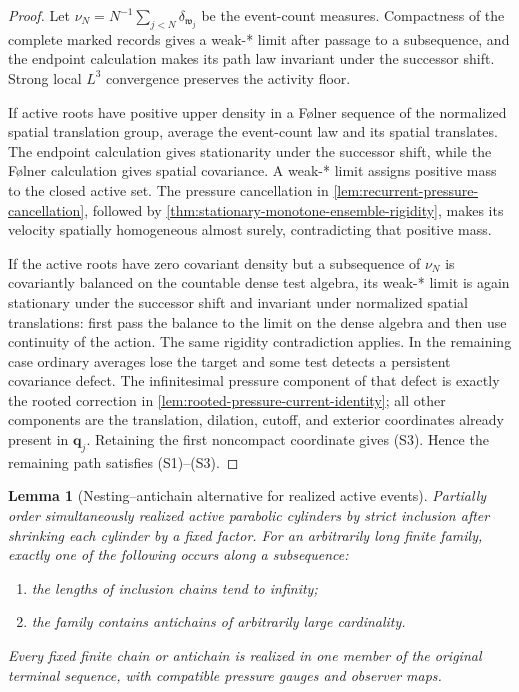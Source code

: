 \documentclass[11pt]{amsart}
\numberwithin{equation}{section}
\theoremstyle{plain}
\newtheorem{lemma}[lemma]{Lemma}
\theoremstyle{definition}
\theoremstyle{remark}
\begin{document}
\begin{proof}
Let \(\nu_N=N^{-1}\sum_{j<N}\delta_{\mathfrak w_j}\) be the event-count
measures.  Compactness of the complete marked records gives a weak-* limit
after passage to a subsequence, and the endpoint calculation makes its path
law invariant under the successor shift.  Strong local \(L^3\) convergence
preserves the activity floor.

If active roots have positive upper density in a F\o lner sequence of the
normalized spatial translation group, average the event-count law and its
spatial translates.  The endpoint calculation gives stationarity under the
successor shift, while the F\o lner calculation gives spatial covariance.  A
weak-* limit assigns positive mass to the closed active set.  The pressure
cancellation in \cref{lem:recurrent-pressure-cancellation}, followed by
\cref{thm:stationary-monotone-ensemble-rigidity}, makes its velocity spatially
homogeneous almost surely, contradicting that positive mass.

If the active roots have zero covariant density but a subsequence of
\(\nu_N\) is covariantly balanced on the countable dense test algebra, its
weak-* limit is again stationary under the successor shift and invariant under
normalized spatial translations: first pass the balance to the limit on the
dense algebra and then use continuity of the action.  The same rigidity
contradiction applies.  In the remaining case ordinary averages
lose the target and some test detects a persistent covariance defect.  The
infinitesimal pressure component of that defect is exactly the rooted
correction in \cref{lem:rooted-pressure-current-identity}; all other components are
the translation, dilation, cutoff, and exterior coordinates already present
in \(\mathbf q_j\).  Retaining the first noncompact coordinate gives
\textup{(S3)}.  Hence the remaining path satisfies
\textup{(S1)}--\textup{(S3)}.
\end{proof}

\begin{lemma}[Nesting--antichain alternative for realized active events]
\label{lem:active-event-nesting-antichain}
Partially order simultaneously realized active parabolic cylinders by
strict inclusion after shrinking each cylinder by a fixed factor.  For an
arbitrarily long finite family, exactly one of the following occurs along a
subsequence:
\begin{enumerate}[label=\textup{(\roman*)},leftmargin=2.2em]
\item the lengths of inclusion chains tend to infinity;
\item the family contains antichains of arbitrarily large cardinality.
\end{enumerate}
Every fixed finite chain or antichain is realized in one member of the
original terminal sequence, with compatible pressure gauges and observer
maps.
\end{lemma}
\end{document}
